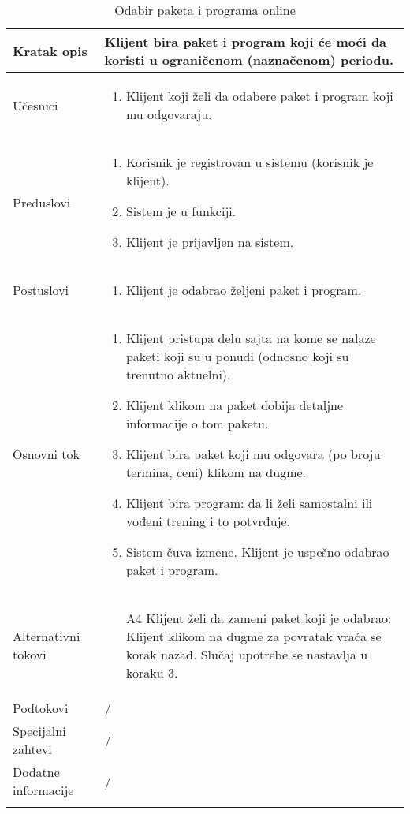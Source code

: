 \documentclass[../main.tex]{subfiles}
\begin{document}
\begin{longtable}{| p{} | p{} |} 

\hline
    Kratak opis & Klijent bira paket i program koji će moći da koristi u ograničenom (naznačenom) periodu. \\ 
\hline    
    Učesnici & 
    	\begin{enumerate}
        \item Klijent koji želi da odabere paket i program koji mu odgovaraju.
     \end{enumerate}\\
\hline
   Preduslovi & \begin{enumerate}
       \item Korisnik je registrovan u sistemu (korisnik je klijent).
       \item Sistem je u funkciji.
       \item Klijent je prijavljen na sistem.
   \end{enumerate}\\
\hline  
    Postuslovi & \begin{enumerate}
        \item Klijent je odabrao željeni paket i program.
    \end{enumerate}\\
\hline
    Osnovni tok & \begin{enumerate}
        \item Klijent pristupa delu sajta na kome se nalaze paketi koji su u ponudi (odnosno koji su trenutno aktuelni).
        \item Klijent klikom na paket dobija detaljne informacije o tom paketu.
        \item Klijent bira paket koji mu odgovara (po broju termina, ceni) klikom na dugme.
        \item Klijent bira program: da li želi samostalni ili vođeni trening i to potvrđuje.
        \item Sistem čuva izmene. Klijent je uspešno odabrao paket i program.
    \end{enumerate}\\
\hline
    Alternativni tokovi & \begin{itemize}
        \item[A4]  Klijent želi da zameni paket koji je odabrao: Klijent klikom na dugme za povratak vraća se korak nazad. Slučaj upotrebe se nastavlja u koraku 3.
    \end{itemize}\\
\hline
    Podtokovi & /\\
\hline
    Specijalni zahtevi & /\\
\hline
    Dodatne informacije & /\\
\hline
\caption{Odabir paketa i programa online} %
\end{longtable}
\end{document}
